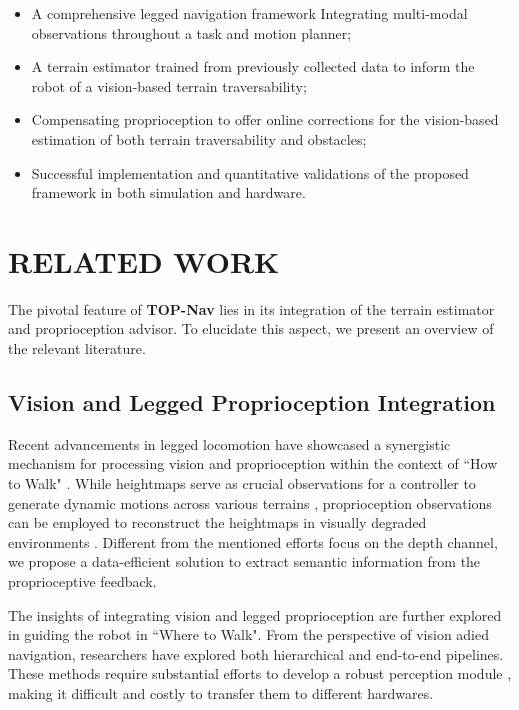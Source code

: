\documentclass[conference]{IEEEtran}
\begin{document}
\begin{itemize}
    \item A comprehensive legged navigation framework Integrating multi-modal observations throughout a task and motion planner;
    \item A terrain estimator trained from previously collected data to inform the robot of a vision-based terrain traversability;
    \item Compensating proprioception to offer online corrections for the vision-based estimation of both terrain traversability and obstacles;
    \item Successful implementation and quantitative validations of the proposed framework in both simulation and hardware.

    
\end{itemize}

\section{RELATED WORK}

The pivotal feature of \textbf{TOP-Nav} lies in its integration of the terrain estimator and proprioception advisor. To elucidate this aspect, we present an overview of the relevant literature. 

\subsection{Vision and Legged Proprioception Integration} 

Recent advancements in legged locomotion have showcased a synergistic mechanism for processing vision and proprioception within the context of ``How to Walk" \cite{agarwal2023legged}. While heightmaps serve as crucial observations for a controller to generate dynamic motions across various terrains \cite{lee2020learning,kumar2021rma}, proprioception observations can be employed to reconstruct the heightmaps in visually degraded environments \cite{miki2022learning}. Different from the mentioned efforts focus on the depth channel, we propose a data-efficient solution to extract semantic information from the proprioceptive feedback. 



The insights of integrating vision and legged proprioception are further explored in guiding the robot in ``Where to Walk". From the perspective of vision adied navigation, researchers have explored both hierarchical \cite{kareer2023vinl,caluwaerts2023barkour} and end-to-end \cite{rudin2022advanced} pipelines. These methods require substantial efforts to develop a robust perception module \cite{hoeller2023anymal}, making it difficult and costly to transfer them to different hardwares. 
\end{document}
